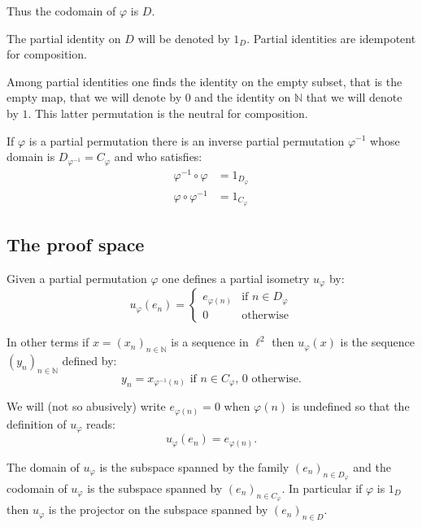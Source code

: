 Thus the codomain of \(\varphi\) is \(D\).

The partial identity on \(D\) will be denoted by \(1_D\). Partial
identities are idempotent for composition.

Among partial identities one finds the identity on the empty subset,
that is the empty map, that we will denote by \(0\) and the identity on
\(\mathbb{N}\) that we will denote by \(1\). This latter permutation is
the neutral for composition.

If \(\varphi\) is a partial permutation there is an inverse partial
permutation \(\varphi^{-1}\) whose domain is
\(D_{\varphi^{-1}} = C_{\varphi}\) and who satisfies:
\begin{align*}
\varphi^{-1}\circ\varphi &= 1_{D_\varphi} \\
\varphi\circ\varphi^{-1} &= 1_{C_\varphi}
\end{align*}


\subsection{The proof space}\label{the-proof-space}

Given a partial permutation \(\varphi\) one defines a partial isometry
\(u_\varphi\) by:
\begin{equation*}
u_\varphi(e_n) =
\begin{cases}
e_{\varphi(n)} & \text{if $n\in D_\varphi$} \\
0 & \text{otherwise}
\end{cases}
\end{equation*}

In other terms if \(x=(x_n)_{n\in\mathbb{N}}\) is a sequence in
\(\ell^2\) then \(u_\varphi(x)\) is the sequence
\((y_n)_{n\in\mathbb{N}}\) defined by:
\begin{equation*}
y_n = x_{\varphi^{-1}(n)} \text{ if $n\in C_\varphi$, $0$ otherwise.}
\end{equation*}

We will (not so abusively) write \(e_{\varphi(n)} = 0\) when
\(\varphi(n)\) is undefined so that the definition of \(u_\varphi\)
reads:
\begin{equation*}
u_\varphi(e_n) = e_{\varphi(n)}.
\end{equation*}

The domain of \(u_\varphi\) is the subspace spanned by the family
\((e_n)_{n\in D_\varphi}\) and the codomain of \(u_\varphi\) is the
subspace spanned by \((e_n)_{n\in C_\varphi}\). In particular if
\(\varphi\) is \(1_D\) then \(u_\varphi\) is the projector on the
subspace spanned by \((e_n)_{n\in D}\).

